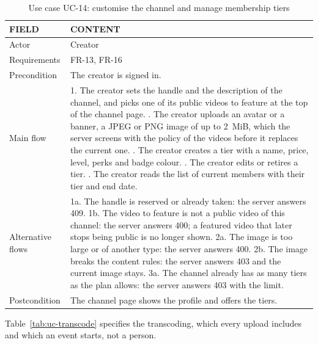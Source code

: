 \begin{table}[H]
\centering
\caption{Use case UC-14: customise the channel and manage membership tiers}
\label{tab:uc-tiers}
\small
\begin{tabularx}{\textwidth}{p{} X}
\toprule
\textbf{FIELD} & \textbf{CONTENT} \\
\midrule
Actor & Creator \\
Requirements & FR-13, FR-16 \\
Precondition & The creator is signed in. \\
Main flow &
  1. The creator sets the handle and the description of the channel, and picks one of its public videos to feature at the top of the channel page. \newline
  2. The creator uploads an avatar or a banner, a JPEG or PNG image of up to 2~MiB, which the server screens with the policy of the videos before it replaces the current one. \newline
  3. The creator creates a tier with a name, price, level, perks and badge colour. \newline
  4. The creator edits or retires a tier. \newline
  5. The creator reads the list of current members with their tier and end date. \\
Alternative flows &
  1a. The handle is reserved or already taken: the server answers 409. \newline
  1b. The video to feature is not a public video of this channel: the server answers 400; a featured video that later stops being public is no longer shown. \newline
  2a. The image is too large or of another type: the server answers 400. \newline
  2b. The image breaks the content rules: the server answers 403 and the current image stays. \newline
  3a. The channel already has as many tiers as the plan allows: the server answers 403 with the limit. \\
Postcondition & The channel page shows the profile and offers the tiers. \\
\bottomrule
\end{tabularx}
\end{table}

Table~\ref{tab:uc-transcode} specifies the transcoding, which every upload includes and which an
event starts, not a person.

